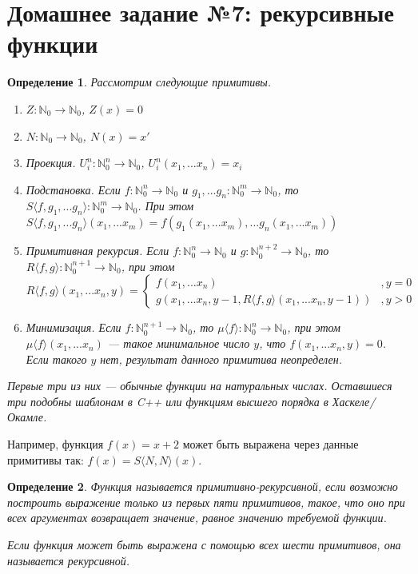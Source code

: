 \documentclass[10pt,a4paper,oneside]{article}
\newtheorem{definition}{Определение}
\begin{document}
\section*{Домашнее задание №7: рекурсивные функции}

\begin{definition}
Рассмотрим следующие примитивы. 
\begin{enumerate}
\item $Z: \mathbb{N}_0 \rightarrow \mathbb{N}_0$, $Z(x) = 0$
\item $N: \mathbb{N}_0 \rightarrow \mathbb{N}_0$, $N(x) = x'$
\item Проекция. $U^n_i: \mathbb{N}_0^n \rightarrow \mathbb{N}_0$, $U^n_i (x_1, ... x_n) = x_i$
\item Подстановка. Если $f: \mathbb{N}_0^n \rightarrow \mathbb{N}_0$ и $g_1, ... g_n: \mathbb{N}_0^m \rightarrow \mathbb{N}_0$, 
  то $S\langle{}f,g_1,...g_n\rangle: \mathbb{N}_0^m \rightarrow \mathbb{N}_0$.
При этом $S\langle{}f,g_1,...g_n\rangle (x_1,...x_m) = f(g_1(x_1,...x_m), ... g_n(x_1,...x_m))$
\item Примитивная рекурсия. Если $f: \mathbb{N}_0^n \rightarrow \mathbb{N}_0$ и $g: \mathbb{N}_0^{n+2} \rightarrow \mathbb{N}_0$, то
  $R\langle{}f,g\rangle: \mathbb{N}_0^{n+1} \rightarrow \mathbb{N}_0$, при этом
  $$R\langle{}f,g\rangle (x_1,...x_n,y) = \left\{\begin{array}{ll}
    f(x_1,...x_n) & , y = 0\\
    g(x_1,...x_n,y-1,R\langle{}f,g\rangle(x_1,...x_n,y-1)) &, y > 0
  \end{array}\right.$$
\item Минимизация. Если $f: \mathbb{N}_0^{n+1} \rightarrow \mathbb{N}_0$, то $\mu \langle{}f\rangle: \mathbb{N}_0^n \rightarrow \mathbb{N}_0$, при этом
  $\mu \langle{}f\rangle (x_1,...x_n)$ --- такое минимальное число $y$, что $f(x_1,...x_n,y) = 0$.
  Если такого $y$ нет, результат данного примитива неопределен.
\end{enumerate}

Первые три из них --- обычные функции на натуральных числах. Оставшиеся три подобны шаблонам в C++ или 
функциям высшего порядка в Хаскеле/Окамле.
\end{definition}

Например, функция $f(x)=x+2$ может быть выражена через данные примитивы так: $f(x) = S\langle N,N\rangle (x)$.

\begin{definition}
Функция называется примитивно-рекурсивной, если возможно построить выражение только из первых пяти примитивов,
такое, что оно при всех аргументах возвращает значение, равное значению требуемой функции.

Если функция может быть выражена с помощью всех шести примитивов, она называется рекурсивной.
\end{definition}
\end{document}
